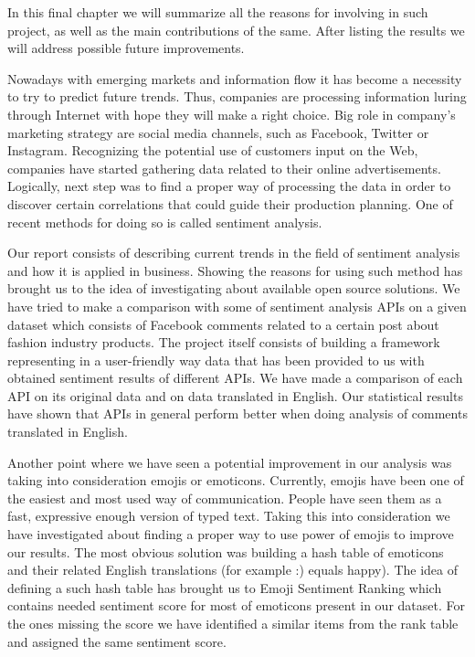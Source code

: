 In this final chapter we will summarize all the reasons for involving in such project, as well as the main contributions of the same. After listing the results we will address possible future improvements.

Nowadays with emerging markets and information flow it has become a necessity to try to predict future trends. Thus, companies are processing information luring through Internet with hope they will make a right choice. Big role in company's marketing strategy are social media channels, such as Facebook, Twitter or Instagram. Recognizing the potential use of customers input on the Web, companies have started gathering data related to their online advertisements. Logically, next step was to find a proper way of processing the data in order to discover certain correlations that could guide their production planning. One of recent methods for doing so is called sentiment analysis.

Our report consists of describing current trends in the field of sentiment analysis and how it is applied in business. Showing the reasons for using such method has brought us to the idea of investigating about available open source solutions. We have tried to make a comparison with some of sentiment analysis APIs on a given dataset which consists of Facebook comments related to a certain post about fashion industry products. The project itself consists of building a framework representing in a user-friendly way data that has been provided to us with obtained sentiment results of different APIs. We have made a comparison of each API on its original data and on data translated in English. Our statistical results have shown that APIs in general perform better when doing analysis of comments translated in English.

Another point where we have seen a potential improvement in our analysis was taking into consideration emojis or emoticons. Currently, emojis have been one of the easiest and most used way of communication. People have seen them as a fast, expressive enough version of typed text. Taking this into consideration we have investigated about finding a proper way to use power of emojis to improve our results. The most obvious solution was building a hash table of emoticons and their related English translations (for example :) equals happy). The idea of defining a such hash table has brought us to Emoji Sentiment Ranking which contains needed sentiment score for most of emoticons present in our dataset. For the ones missing the score we have identified a similar items from the rank table and assigned the same sentiment score.

